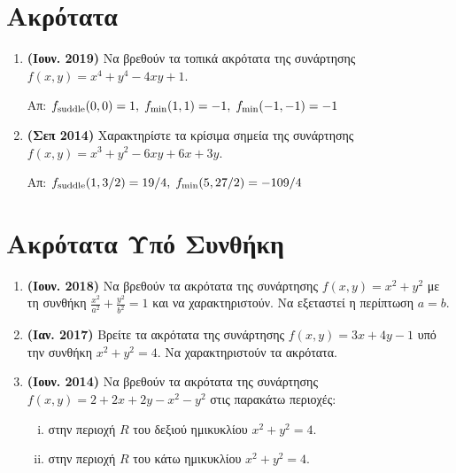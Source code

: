 


\pagestyle{askhseis}

\renewcommand{\vec}{\mathbf}



\begin{center}
  \minibox{\large \bfseries \textcolor{Col1}{θέματα στα Ακρότατα Συναρτήσεων πολλών
  Μεταβλητών}}
\end{center}

\vspace{\baselineskip}

\section*{Ακρότατα}

\begin{enumerate}
  \item \textbf{(Ιουν. 2019)} Να βρεθούν τα τοπικά ακρότατα της συνάρτησης 
    $ f(x,y) = x^{4}+y^{4}-4xy+1 $.

    \hfill Απ: $ f_{\rm{suddle}}(0,0) = 1, \; f_{\min}(1,1)=-1, \; f_{\min}(-1,-1)=-1 $

  \item \textbf{(Σεπ 2014)} Χαρακτηρίστε τα κρίσιμα σημεία της συνάρτησης 
    $ f(x,y) = x^{3}+y^{2} -6xy+6x+3y $.

    \hfill Απ: $ f_{\rm{suddle}}(1,3/2) = 19/4, \; f_{\min}(5,27/2) = -109/4 $ 
\end{enumerate}


\section*{Ακρότατα Υπό Συνθήκη}

\begin{enumerate}
  \item \textbf{(Ιουν. 2018)} Να βρεθούν τα ακρότατα της συνάρτησης 
    $ f(x,y) = x^{2}+y^{2} $ με τη συνθήκη 
    $ \frac{x^{2}}{a^{2}} + \frac{y^{2}}{b^{2}} = 1 $ και να χαρακτηριστούν. 
    Να εξεταστεί η περίπτωση $ a=b $.

  \item \textbf{(Ιαν. 2017)} Βρείτε τα ακρότατα της συνάρτησης $ f(x,y) = 3x+4y-1 $ 
    υπό την συνθήκη $ x^{2}+y^{2}=4 $. Να χαρακτηριστούν τα ακρότατα.

  \item \textbf{(Ιουν. 2014)} Να βρεθούν τα ακρότατα της συνάρτησης 
    $ f(x,y) = 2+2x+2y-x^{2}-y^{2} $ στις παρακάτω περιοχές:
    \begin{enumerate}[i)]
      \item στην περιοχή $ R $ του δεξιού ημικυκλίου $ x^{2}+y^{2}=4 $.
      \item στην περιοχή $ R $ του κάτω ημικυκλίου $ x^{2}+y^{2}=4 $.
    \end{enumerate}
\end{enumerate}


